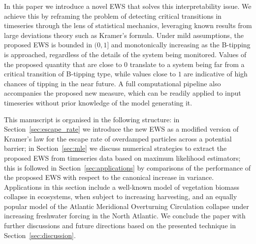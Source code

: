 \documentclass[a4paper,fleqn]{cas-sc}
\newcommand{\sref}[1]{Section~\ref{#1}}
\begin{document}
In this paper we introduce a novel EWS that solves this interpretability issue. 
We achieve this by reframing the problem of detecting critical transitions in timeseries through the lens of statistical mechanics, leveraging known results from large deviations theory such as Kramer's formula.
Under mild assumptions, the proposed EWS is bounded in $(0,1]$ and monotonically increasing as the B-tipping is approached, regardless of the details of the system being monitored. 
Values of the proposed quantity that are close to $0$ translate to a system being far from a critical transition of B-tipping type, while values close to $1$ are indicative of high chances of tipping in the near future.
A full computational pipeline also accompanies the proposed new measure, which can be readily applied to input timeseries without prior knowledge of the model generating it.

This manuscript is organised in the following structure: in \sref{sec:escape_rate} we introduce the new EWS as a modified version of Kramer's law for the escape rate of overdamped particles across a potential barrier; 
in \sref{sec:mle} we discuss numerical strategies to extract the proposed EWS from timeseries data based on maximum likelihood estimators; 
this is followed in \sref{sec:applications} by comparisons of the performance of the proposed EWS with respect to the canonical increase in variance.
Applications in this section include a well-known model of vegetation biomass collapse in ecosystems, when subject to increasing harvesting, and an equally popular model of the Atlantic Meridional Overturning Circulation collapse under increasing freshwater forcing in the North Atlantic. 
We conclude the paper with further discussions and future directions based on the presented technique in \sref{sec:discussion}.
%
\end{document}
